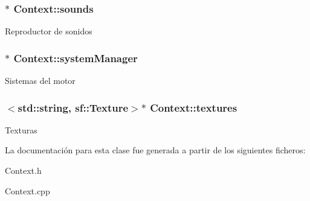 \subsubsection[{sounds}]{$\ast$ Context\+::sounds}\label{classContext_ad83991aa701d0e22274e61e8bedb186f}
Reproductor de sonidos \hypertarget{classContext_a7df558279371bada0354b48cd88353dc}{}
\subsubsection[{system\+Manager}]{$\ast$ Context\+::system\+Manager}\label{classContext_a7df558279371bada0354b48cd88353dc}
Sistemas del motor \hypertarget{classContext_a59ac23d12151de1912ab7f6d76e182b8}{}
\subsubsection[{textures}]{$<$std\+::string, sf\+::\+Texture$>$$\ast$ Context\+::textures}\label{classContext_a59ac23d12151de1912ab7f6d76e182b8}
Texturas 

La documentación para esta clase fue generada a partir de los siguientes ficheros\+:\begin{DoxyCompactItemize}
\item 
Context.\+h\item 
Context.\+cpp\end{DoxyCompactItemize}
